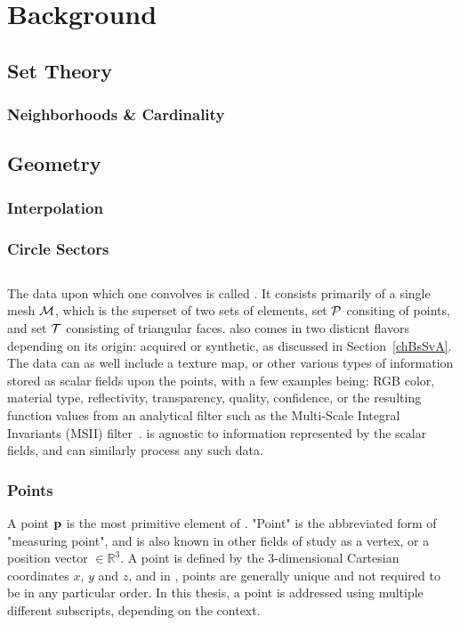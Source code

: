 \chapter{Background}
\section{Set Theory}
\subsection{Neighborhoods \& Cardinality}
%
\section{Geometry}
%
\subsection{Interpolation}
%
\subsection{Circle Sectors}
%
\section{\tdd}
The data upon which one convolves  is called \tdd{}. It consists primarily of a single mesh $\mathcal{M}$, which is the superset of two sets of elements, set $\mathcal{P}$ consiting of points, and set $\mathcal{T}$ consisting of triangular faces. \tdd{} also comes in two disticnt flavors depending on its origin: acquired or synthetic, as discussed in Section~\ref{chBsSvA}. The data can as well include a texture map, or other various types of information stored as scalar fields upon the points, with a few examples being: RGB color, material type, reflectivity, transparency, quality, confidence, or the resulting function values from an analytical filter such as the Multi-Scale Integral Invariants (MSII) filter~\cite[p.~21]{Mara12}.  is agnostic to information represented by the scalar fields, and can similarly process any such data.%
%
%
\subsection{Points}
\label{chBsP}
A point $\mathbf{p}$ is the most primitive element of \tdd{}. "Point" is the abbreviated form of "measuring point", and is also known in other fields of study as a vertex, or a position vector $\in \mathbb{R}^3$. A point is defined by the 3-dimensional Cartesian coordinates $x$, $y$ and $z$, and in \tdd{}, points are generally unique and not required to be in any particular order. In this thesis, a point is addressed using multiple different subscripts, depending on the context.

